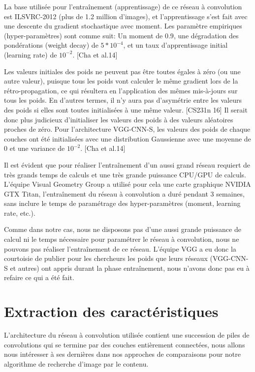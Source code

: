 	La base utilisée pour l’entraînement (apprentissage) de ce réseau à convolution est ILSVRC-2012 (plus de 1.2 million d'images), et l'apprentissage s'est fait avec une descente du gradient stochastique avec moment. Les paramètre empiriques (hyper-paramètres) sont comme suit: Un moment de $0.9$, une dégradation des pondérations (weight decay) de $5*10^{-4}$, et un taux d'apprentissage initial (learning rate) de $10^{-2}$. [Cha et al.14]
	
	Les valeurs initiales des poids ne peuvent pas être toutes égales à zéro (ou une autre valeur), puisque tous les poids vont calculer le même gradient lors de la rétro-propagation, ce qui résultera en l'application des mêmes mis-à-jours sur tous les poids. En d'autres termes, il n'y aura pas d’asymétrie entre les valeurs des poids si elles sont toutes initialisées à une même valeur. [CS231n 16]	
	Il serait donc plus judicieux d'initialiser les valeurs des poids à des valeurs aléatoires proches de zéro. Pour l'architecture VGG-CNN-S, les valeurs des poids de chaque couches ont été initialisées avec une distribution Gaussienne avec une moyenne de 0 et une variance de $10^{-2}$. [Cha et al.14]
	
	Il est évident que pour réaliser l’entraînement d'un aussi grand réseau requiert de très grands temps de calculs et une très grande puissance CPU/GPU de calculs. L'équipe Visual Geometry Group a utilisé pour cela une carte graphique NVIDIA GTX Titan, l'entraînement du réseau à convolution a duré pendant 3 semaines, sans inclure le temps de paramétrage des hyper-paramètres (moment, learning rate, etc.).
	
	Comme dans notre cas, nous ne disposons pas d'une aussi grande puissance de calcul ni le temps nécessaire pour paramétrer le réseau à convolution, nous ne pouvons pas réaliser l’entraînement de ce réseau. L'équipe VGG a eu donc la courtoisie de publier pour les chercheurs les poids que leurs réseaux (VGG-CNN-S et autres) ont appris durant la phase entraînement, nous n'avons donc pas eu à refaire ce qui a été fait.


\section{Extraction des caractéristiques}
	L'architecture du réseau à convolution utilisée contient une succession de piles de convolutions qui se termine par des couches entièrement connectées, nous allons nous intéresser à ses dernières dans nos approches de comparaisons pour notre algorithme de recherche d'image par le contenu.

